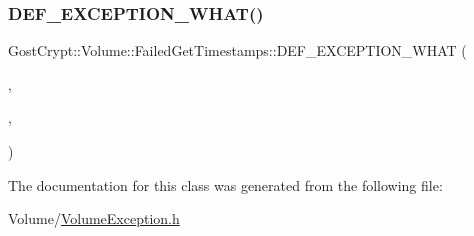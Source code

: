 \subsubsection{\texorpdfstring{D\+E\+F\+\_\+\+E\+X\+C\+E\+P\+T\+I\+O\+N\+\_\+\+W\+H\+A\+T()}{DEF\_EXCEPTION\_WHAT()}}
{\footnotesize\ttfamily Gost\+Crypt\+::\+Volume\+::\+Failed\+Get\+Timestamps\+::\+D\+E\+F\+\_\+\+E\+X\+C\+E\+P\+T\+I\+O\+N\+\_\+\+W\+H\+AT (\begin{DoxyParamCaption}\item[{\hyperlink{class_gost_crypt_1_1_volume_1_1_failed_get_timestamps}{Failed\+Get\+Timestamps}}]{,  }\item[{\hyperlink{class_gost_crypt_1_1_volume_1_1_volume_exception}{Volume\+Exception}}]{,  }\item[{\char`\"{}Failed to get the timestamps of the volume file.\char`\"{}}]{ }\end{DoxyParamCaption})}



The documentation for this class was generated from the following file\+:\begin{DoxyCompactItemize}
\item 
Volume/\hyperlink{_volume_exception_8h}{Volume\+Exception.\+h}\end{DoxyCompactItemize}
